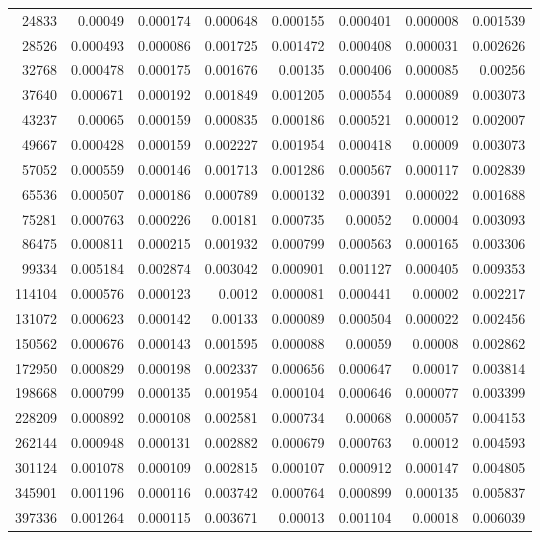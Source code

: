 \begin{tabular}{r r r r r r r r}
24833 & 0.00049 & 0.000174 & 0.000648 & 0.000155 & 0.000401 & 0.000008 & 0.001539 \\
28526 & 0.000493 & 0.000086 & 0.001725 & 0.001472 & 0.000408 & 0.000031 & 0.002626 \\
32768 & 0.000478 & 0.000175 & 0.001676 & 0.00135 & 0.000406 & 0.000085 & 0.00256 \\
37640 & 0.000671 & 0.000192 & 0.001849 & 0.001205 & 0.000554 & 0.000089 & 0.003073 \\
43237 & 0.00065 & 0.000159 & 0.000835 & 0.000186 & 0.000521 & 0.000012 & 0.002007 \\
49667 & 0.000428 & 0.000159 & 0.002227 & 0.001954 & 0.000418 & 0.00009 & 0.003073 \\
57052 & 0.000559 & 0.000146 & 0.001713 & 0.001286 & 0.000567 & 0.000117 & 0.002839 \\
65536 & 0.000507 & 0.000186 & 0.000789 & 0.000132 & 0.000391 & 0.000022 & 0.001688 \\
75281 & 0.000763 & 0.000226 & 0.00181 & 0.000735 & 0.00052 & 0.00004 & 0.003093 \\
86475 & 0.000811 & 0.000215 & 0.001932 & 0.000799 & 0.000563 & 0.000165 & 0.003306 \\
99334 & 0.005184 & 0.002874 & 0.003042 & 0.000901 & 0.001127 & 0.000405 & 0.009353 \\
114104 & 0.000576 & 0.000123 & 0.0012 & 0.000081 & 0.000441 & 0.00002 & 0.002217 \\
131072 & 0.000623 & 0.000142 & 0.00133 & 0.000089 & 0.000504 & 0.000022 & 0.002456 \\
150562 & 0.000676 & 0.000143 & 0.001595 & 0.000088 & 0.00059 & 0.00008 & 0.002862 \\
172950 & 0.000829 & 0.000198 & 0.002337 & 0.000656 & 0.000647 & 0.00017 & 0.003814 \\
198668 & 0.000799 & 0.000135 & 0.001954 & 0.000104 & 0.000646 & 0.000077 & 0.003399 \\
228209 & 0.000892 & 0.000108 & 0.002581 & 0.000734 & 0.00068 & 0.000057 & 0.004153 \\
262144 & 0.000948 & 0.000131 & 0.002882 & 0.000679 & 0.000763 & 0.00012 & 0.004593 \\
301124 & 0.001078 & 0.000109 & 0.002815 & 0.000107 & 0.000912 & 0.000147 & 0.004805 \\
345901 & 0.001196 & 0.000116 & 0.003742 & 0.000764 & 0.000899 & 0.000135 & 0.005837 \\
397336 & 0.001264 & 0.000115 & 0.003671 & 0.00013 & 0.001104 & 0.00018 & 0.006039 \\

\end{tabular}
